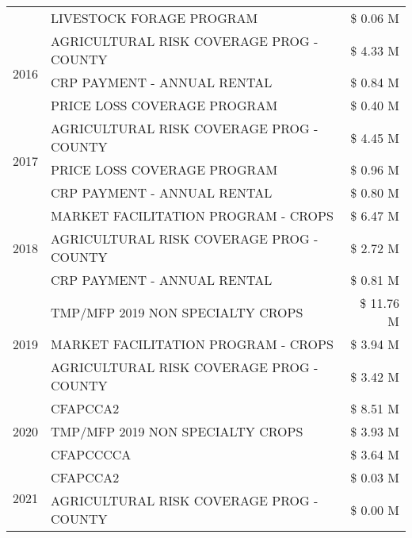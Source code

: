 \begin{tabular}{llr}
 & LIVESTOCK FORAGE PROGRAM & \$ 0.06 M \\
\cline{1-3}
\multirow[t]{3}{*}{2016} & AGRICULTURAL RISK COVERAGE PROG - COUNTY & \$ 4.33 M \\
 & CRP PAYMENT - ANNUAL RENTAL & \$ 0.84 M \\
 & PRICE LOSS COVERAGE PROGRAM & \$ 0.40 M \\
\cline{1-3}
\multirow[t]{3}{*}{2017} & AGRICULTURAL RISK COVERAGE PROG - COUNTY & \$ 4.45 M \\
 & PRICE LOSS COVERAGE PROGRAM & \$ 0.96 M \\
 & CRP PAYMENT - ANNUAL RENTAL & \$ 0.80 M \\
\cline{1-3}
\multirow[t]{3}{*}{2018} & MARKET FACILITATION PROGRAM - CROPS & \$ 6.47 M \\
 & AGRICULTURAL RISK COVERAGE PROG - COUNTY & \$ 2.72 M \\
 & CRP PAYMENT - ANNUAL RENTAL & \$ 0.81 M \\
\cline{1-3}
\multirow[t]{3}{*}{2019} & TMP/MFP 2019 NON SPECIALTY CROPS & \$ 11.76 M \\
 & MARKET FACILITATION PROGRAM - CROPS & \$ 3.94 M \\
 & AGRICULTURAL RISK COVERAGE PROG - COUNTY & \$ 3.42 M \\
\cline{1-3}
\multirow[t]{3}{*}{2020} & CFAPCCA2 & \$ 8.51 M \\
 & TMP/MFP 2019 NON SPECIALTY CROPS & \$ 3.93 M \\
 & CFAPCCCCA & \$ 3.64 M \\
\cline{1-3}
\multirow[t]{2}{*}{2021} & CFAPCCA2 & \$ 0.03 M \\
 & AGRICULTURAL RISK COVERAGE PROG - COUNTY & \$ 0.00 M \\
\cline{1-3}
\bottomrule
\end{tabular}
